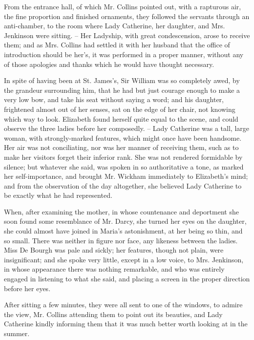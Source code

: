 From the entrance hall, of which Mr. Collins pointed
out, with a rapturous air, the fine proportion and finished
ornaments, they followed the servants through an anti-chamber,
to the room where Lady Catherine, her daughter,
and Mrs. Jenkinson were sitting. -- Her Ladyship, with
great condescension, arose to receive them; and as Mrs.
Collins had settled it with her husband that the office of
introduction should be her’s, it was performed in a proper
manner, without any of those apologies and thanks which
he would have thought necessary.

In spite of having been at St. James’s, Sir William was
so completely awed, by the grandeur surrounding him, that
he had but just courage enough to make a very low bow,
and take his seat without saying a word; and his daughter,
frightened almost out of her senses, sat on the edge of her
chair, not knowing which way to look. Elizabeth found
herself quite equal to the scene, and could observe the three
ladies before her composedly. -- Lady Catherine was a tall,
large woman, with strongly-marked features, which might
once have been handsome. Her air was not conciliating, nor
was her manner of receiving them, such as to make her
visitors forget their inferior rank. She was not rendered
formidable by silence; but whatever she said, was spoken
in so authoritative a tone, as marked her self-importance,
and brought Mr. Wickham immediately to Elizabeth’s
mind; and from the observation of the day altogether,
she believed Lady Catherine to be exactly what he had
represented.

When, after examining the mother, in whose countenance
and deportment she soon found some resemblance
of Mr. Darcy, she turned her eyes on the daughter, she
could almost have joined in Maria’s astonishment, at her
being so thin, and so small. There was neither in figure
nor face, any likeness between the ladies. Miss De Bourgh
was pale and sickly; her features, though not plain, were
insignificant; and she spoke very little, except in a low
voice, to Mrs. Jenkinson, in whose appearance there was
nothing remarkable, and who was entirely engaged in
listening to what she said, and placing a screen in the
proper direction before her eyes.

After sitting a few minutes, they were all sent to one
of the windows, to admire the view, Mr. Collins attending
them to point out its beauties, and Lady Catherine kindly
informing them that it was much better worth looking at
in the summer.

